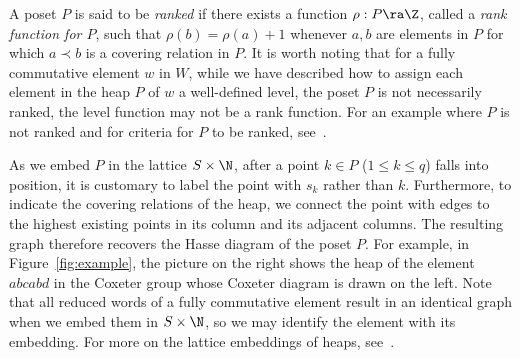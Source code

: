  \begin{rema}
 A poset $P$ is said to be \emph{ranked} if there exists a function
 $\rho: P\ra \Z$, called a \emph{rank function for $P$}, such that
 $\rho(b)=\rho(a)+1$ whenever $a,b$ are elements in $P$ for which $a\prec b$
 is a covering relation in
 $P$. It is worth noting that for a fully commutative element
 $w$ in
 $W$, while we have described how to assign each element in the heap $P$
 of $w$ a
 well-defined level, the poset $P$ is not
 necessarily ranked, \ie the level function may not be a rank function.
 For an example where $P$ is not ranked and for criteria for $P$ to be
 ranked, see~\cite{Green_interval}.
 \end{rema}

 
 As we embed $P$ in the lattice $S\times \N$, after a point $k\in P$ ($1\le k\le q$) falls into position, it is customary to
 label the point with $s_k$ rather than $k$. Furthermore, to indicate the covering relations of the heap, we connect the point with
 edges to the highest existing points in its column and its adjacent
 columns. The resulting graph therefore recovers the Hasse diagram
 of the poset $P$. 
 For example, in Figure~\ref{fig:example}, the picture on the right shows the heap of
 the element $abcabd$ in the Coxeter group whose Coxeter diagram is drawn on the
 left. Note that
 all reduced words of a fully commutative element result in an identical
 graph when we embed them in $S\times \N$, so
 we may identify the element with its embedding. For more on the lattice
 embeddings of heaps, see~\cite{BJ}.

 

